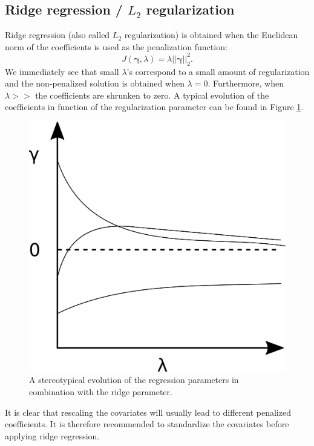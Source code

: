 \label{sec:Regularization}
\subsection{Ridge regression / $L_2$ regularization}
\label{sec:L2Regularization}
Ridge regression (also called $L_2$ regularization) is obtained when the Euclidean norm of the coefficients is used as the penalization function:
\[J(\bm{\gamma},\lambda) = \lambda \vert \vert \bm{\gamma} \vert \vert ^2 _2.\]
We immediately see that small $\lambda$'s correspond to a small amount of regularization and the non-penalized solution is obtained when $\lambda = 0.$ Furthermore, when $\lambda >>$ the coefficients are shrunken to zero. A typical evolution of the coefficients in function of the regularization parameter can be found in Figure \ref{fig:RidgeTrace}.\\ 

\begin{figure}[!htb]
\centering
\includegraphics[scale=0.75]{VectorGraphics/ridgeTrace.png}
\caption{\label{fig:RidgeTrace}A stereotypical evolution of the regression parameters in combination with the ridge parameter.}
\end{figure}

It is clear that rescaling the covariates will usually lead to different penalized coefficients. It is therefore recommended to standardize the covariates before applying ridge regression.\\

